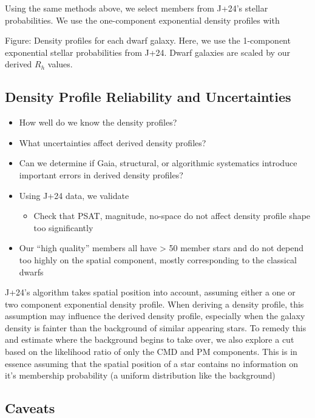 Using the same methods above, we select members from J+24's stellar
probabilities. We use the one-component exponential density profiles
with

Figure: Density profiles for each dwarf galaxy. Here, we use the
1-component exponential stellar probabilities from J+24. Dwarf galaxies
are scaled by our derived \(R_h\) values.

\subsection{Density Profile Reliability and
Uncertainties}\label{density-profile-reliability-and-uncertainties}

\begin{itemize}
\tightlist
\item
  How well do we know the density profiles?
\item
  What uncertainties affect derived density profiles?
\item
  Can we determine if Gaia, structural, or algorithmic systematics
  introduce important errors in derived density profiles?
\item
  Using J+24 data, we validate

  \begin{itemize}
  \tightlist
  \item
    Check that PSAT, magnitude, no-space do not affect density profile
    shape too significantly
  \end{itemize}
\item
  Our ``high quality'' members all have \textgreater{} 50 member stars
  and do not depend too highly on the spatial component, mostly
  corresponding to the classical dwarfs
\end{itemize}

J+24's algorithm takes spatial position into account, assuming either a
one or two component exponential density profile. When deriving a
density profile, this assumption may influence the derived density
profile, especially when the galaxy density is fainter than the
background of similar appearing stars. To remedy this and estimate where
the background begins to take over, we also explore a cut based on the
likelihood ratio of only the CMD and PM components. This is in essence
assuming that the spatial position of a star contains no information on
it's membership probability (a uniform distribution like the background)

\subsection{Caveats}\label{caveats}


